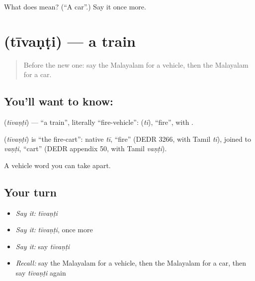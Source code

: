 \begin{tcolorbox}[breakable,colback=teal!4,colframe=teal!35!black,title={Before you move on}]
What does  mean? (\textquotedblleft{}A car\textquotedblright{}.) Say it once more.
\end{tcolorbox}
\section[\texorpdfstring{\ml{തീവണ്ടി} (tīvaṇṭi)}{തീവണ്ടി (tīvaṇṭi)}]{ (tīvaṇṭi) — a train}

\label{lesson:ML-C137-train}



\begin{quote}
Before the new one: say the Malayalam for a vehicle, then the Malayalam for a car.
\end{quote}

\subsection*{You'll want to know: }
\textbf{} (\emph{tīvaṇṭi}) — \textquotedblleft{}a train\textquotedblright{}, literally \textquotedblleft{}fire-vehicle\textquotedblright{}: \textbf{} (\emph{tī}), \textquotedblleft{}fire\textquotedblright{}, with \textbf{}.

\begin{cousinweb}
\textbf{} (\emph{tīvaṇṭi}) is \textquotedblleft{}the fire-cart\textquotedblright{}: native \emph{tī}, \textquotedblleft{}fire\textquotedblright{} (DEDR 3266, with Tamil \emph{tī}), joined to \emph{vaṇṭi}, \textquotedblleft{}cart\textquotedblright{} (DEDR appendix 50, with Tamil \emph{vaṇṭi}).
\end{cousinweb}

\begin{grammarlens}[title={What you've built}]
A vehicle word you can take apart.
\end{grammarlens}

\subsection*{Your turn}
\begin{itemize}
\raggedright
  \item \emph{Say it:} \emph{tīvaṇṭi}
  \item \emph{Say it:} \emph{tīvaṇṭi}, once more
  \item \emph{Say it:} say \emph{tīvaṇṭi}
  \item \emph{Recall:} say the Malayalam for a vehicle, then the Malayalam for a car, then say \emph{tīvaṇṭi} again
\end{itemize}

